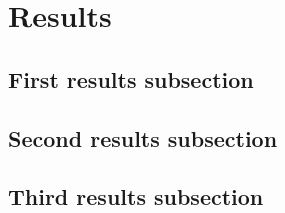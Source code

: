 \section{Results}

\subsection{First results subsection}

\subsection{Second results subsection}

\subsection{Third results subsection}
